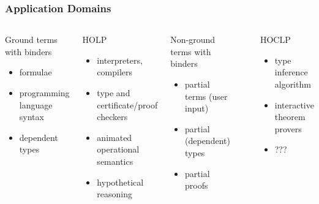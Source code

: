 \documentclass{beamer}
\begin{document}
\begin{frame}[fragile]
 \frametitle{Application Domains}
 \begin{columns}[t]
  \begin{block}{Ground terms with binders}
   \begin{itemize}
    \item formulae
    \item programming language syntax
    \item dependent types
   \end{itemize}
  \end{block}
  \begin{block}{HOLP}
   \begin{itemize}
    \item interpreters, compilers
    \item \alert{type and certificate/proof checkers}
    \item animated operational semantics
    \item hypothetical reasoning
   \end{itemize}
  \end{block}

  \begin{block}{Non-ground terms with binders}
   \begin{itemize}
    \item partial terms (user input)
    \item partial (dependent) types
    \item \alert{partial proofs}
   \end{itemize}
  \end{block}
  ~
  \begin{block}{HOCLP}
   \begin{itemize}
    \item type inference algorithm
    \item \alert{interactive theorem provers}
    \item ???
   \end{itemize}

   ~
  \end{block}
 \end{columns}
\end{frame}
\end{document}
